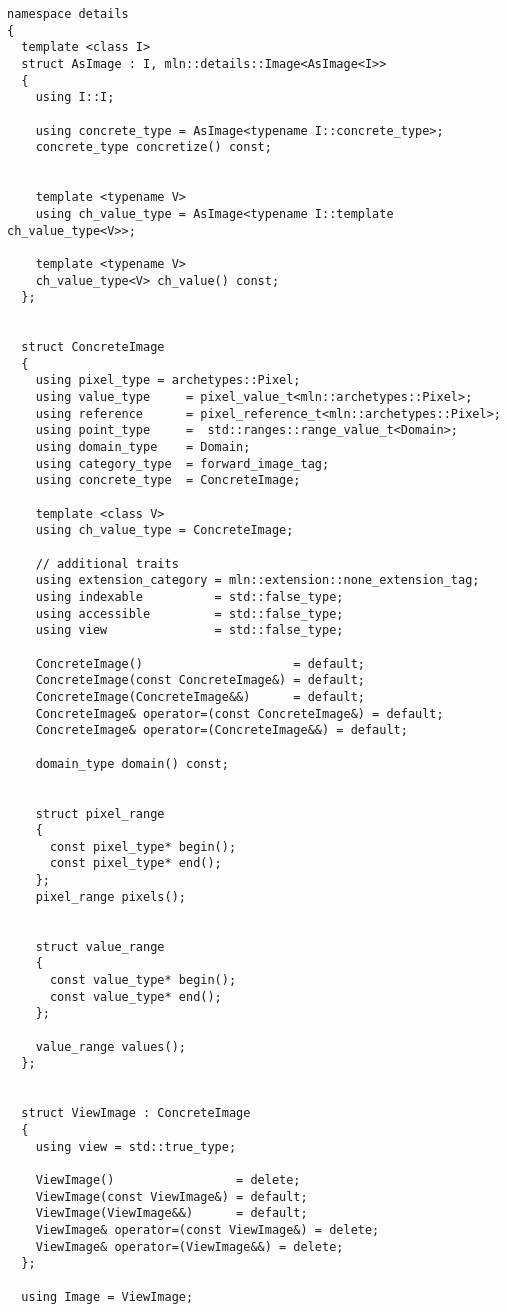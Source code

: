 \begin{verbatim}
namespace details
{
  template <class I>
  struct AsImage : I, mln::details::Image<AsImage<I>>
  {
    using I::I;

    using concrete_type = AsImage<typename I::concrete_type>;
    concrete_type concretize() const;


    template <typename V>
    using ch_value_type = AsImage<typename I::template ch_value_type<V>>;

    template <typename V>
    ch_value_type<V> ch_value() const;
  };


  struct ConcreteImage
  {
    using pixel_type = archetypes::Pixel;
    using value_type     = pixel_value_t<mln::archetypes::Pixel>;
    using reference      = pixel_reference_t<mln::archetypes::Pixel>;
    using point_type     =  std::ranges::range_value_t<Domain>;
    using domain_type    = Domain;
    using category_type  = forward_image_tag;
    using concrete_type  = ConcreteImage;

    template <class V>
    using ch_value_type = ConcreteImage;

    // additional traits
    using extension_category = mln::extension::none_extension_tag;
    using indexable          = std::false_type;
    using accessible         = std::false_type;
    using view               = std::false_type;

    ConcreteImage()                     = default;
    ConcreteImage(const ConcreteImage&) = default;
    ConcreteImage(ConcreteImage&&)      = default;
    ConcreteImage& operator=(const ConcreteImage&) = default;
    ConcreteImage& operator=(ConcreteImage&&) = default;

    domain_type domain() const;


    struct pixel_range
    {
      const pixel_type* begin();
      const pixel_type* end();
    };
    pixel_range pixels();


    struct value_range
    {
      const value_type* begin();
      const value_type* end();
    };

    value_range values();
  };


  struct ViewImage : ConcreteImage
  {
    using view = std::true_type;

    ViewImage()                 = delete;
    ViewImage(const ViewImage&) = default;
    ViewImage(ViewImage&&)      = default;
    ViewImage& operator=(const ViewImage&) = delete;
    ViewImage& operator=(ViewImage&&) = delete;
  };

  using Image = ViewImage;



\end{verbatim}
